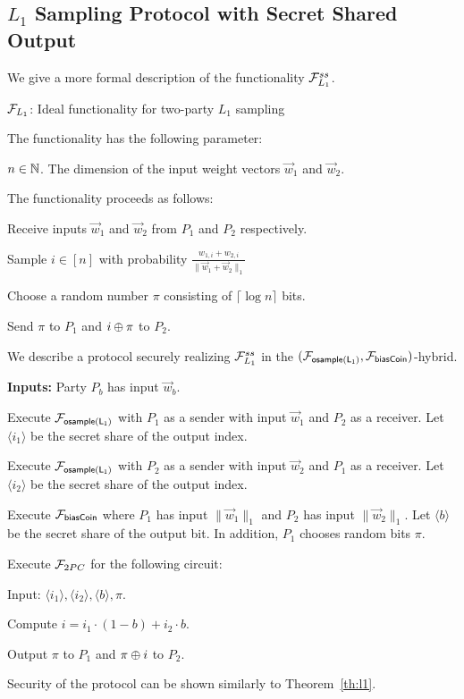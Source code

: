 \subsection{$L_1$ Sampling Protocol with Secret Shared Output}  \label{apx:ssL1}
 
We give a more formal description of the functionality $\F_{L_1}^{ss}$. 

\bbox
{
\begin{center}
 $\mathcal{F}_{L_1}$:  Ideal functionality for two-party $L_1$ sampling
\end{center}

The functionality has the following parameter:
\BI
\item $n \in \mathbb{N}$. The dimension of the input weight vectors $\vec{w}_1$ and $\vec{w}_2$.
\EI

The functionality proceeds as follows:
\BEN
\item Receive inputs $\vec w_1$ and $\vec w_2$ from $P_1$ and $P_2$
respectively. 
\item Sample $i \in [n]$ with probability $\frac{w_{1,i} +
w_{2,i}}{ \|\vec{w}_1 + \vec{w}_2\|_1 }$
\item Choose a random number $\pi$ consisting of $\lceil \log n \rceil$ bits.
\item Send $\pi$ to $P_1$ and $i \oplus \pi$ to $P_2$. 
\EEN 

}

\medskip

We describe a protocol securely realizing
$\F_{L_1}^{ss}$ in the $(\F_\oslone, \F_\bcoin)$-hybrid. 

\begin{algorithm}[h]
\textbf{Inputs:} Party $P_b$ has input $\vec{w}_b$. 

\BEN
\item Execute $\mathcal{F}_{\mathsf{osample(L_1)}}$ with $P_1$ as a sender with input $\vec{w}_1$
and $P_2$ as a receiver. Let $\langle i_1 \rangle$ be the secret share of the output
index. 

\item Execute $\mathcal{F}_{\mathsf{osample(L_1)}}$ with $P_2$ as a sender with input $\vec{w}_2$
and $P_1$ as a receiver. Let $\langle i_2 \rangle$ be the secret share of the output
index.

\item Execute $\mathcal{F}_{\mathsf{biasCoin}}$ where $P_1$ has input $\|\vec{w}_1\|_1$ and
$P_2$ has input $\|\vec{w}_2\|_1$. Let $\langle b \rangle$ be the secret share of the
output bit. In addition, $P_1$ chooses random bits $\pi$.

\item Execute $\mathcal{F}_{2PC}$ for the following circuit: 
      \BEN
      \item Input: $\langle i_1 \rangle, \langle i_2 \rangle, \langle b \rangle, \pi$. 
      \item Compute $i = i_1 \cdot (1-b) + i_2 \cdot b$.
      \item Output $\pi$ to $P_1$ and $\pi \oplus i$ to $P_2$.
      \EEN
\EEN

\caption{Protocol securely realizing $\F_{L_1}^{ss}$ in the $(\F_\oslone, \F_\bcoin)$-hybrid.}
\end{algorithm}

Security of the protocol can be shown similarly to Theorem~\ref{th:l1}.  
